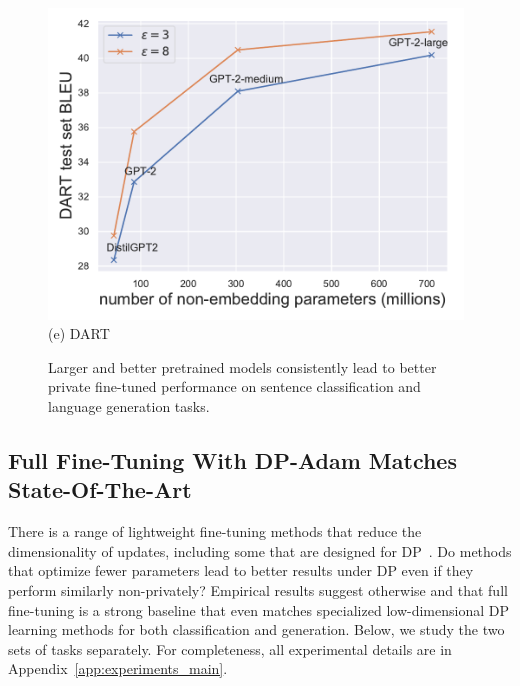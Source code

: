 \begin{figure}[ht]
\begin{center}
\begin{minipage}[t]{0.45\linewidth}
\centering
{\includegraphics[width=0.98\textwidth]{figs/dart_scaling_BLEU.pdf}}
(e) DART
\end{minipage}
\end{center}

\caption{
Larger and better pretrained models consistently lead to better private fine-tuned performance on sentence classification and language generation tasks.
}
\label{fig:fig1_extension}
\end{figure}

\subsection{\normalsize Full Fine-Tuning With DP-Adam Matches State-Of-The-Art}\label{sec:experiments_main}
There is a range of lightweight fine-tuning methods that reduce the dimensionality of updates, including some that are designed for DP~\citep{yu2021large}.
Do methods that optimize fewer parameters lead to better results under DP even if they perform similarly non-privately? Empirical results suggest otherwise and that full fine-tuning is a strong baseline that even matches specialized low-dimensional DP learning methods for both classification and generation.
Below, we study the two sets of tasks separately. 
For completeness, all experimental details are in Appendix~\ref{app:experiments_main}.

